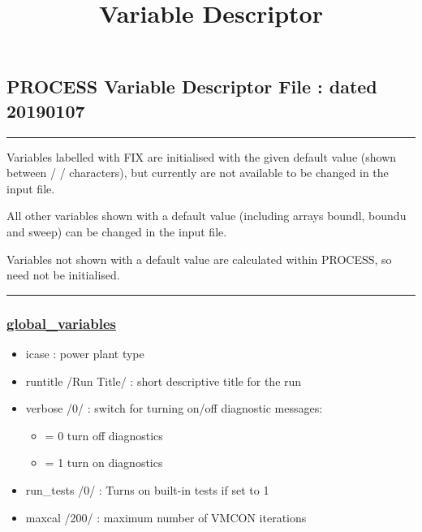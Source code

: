 \documentclass[]{article}
\title{Variable Descriptor}
\date{}
\providecommand{\tightlist}{%
  \setlength{\itemsep}{0pt}\setlength{\parskip}{0pt}}
\begin{document}
\maketitle

\subsection{PROCESS Variable Descriptor File : dated
20190107}\label{process-variable-descriptor-file-dated-20190107}

\begin{center}\rule{0.5\linewidth}{\linethickness}\end{center}

Variables labelled with FIX are initialised with the given default value
(shown between / / characters), but currently are not available to be
changed in the input file.

All other variables shown with a default value (including arrays boundl,
boundu and sweep) can be changed in the input file.

Variables not shown with a default value are calculated within PROCESS,
so need not be initialised.

\begin{center}\rule{0.5\linewidth}{\linethickness}\end{center}

\subsubsection{\texorpdfstring{\href{global_variables.html}{global\_variables}}{global\_variables}}\label{global_variables}

\begin{itemize}
\tightlist
\item
  icase : power plant type
\item
  runtitle /Run Title/ : short descriptive title for the run
\item
  verbose /0/ : switch for turning on/off diagnostic messages:

  \begin{itemize}
  \tightlist
  \item
    = 0 turn off diagnostics
  \item
    = 1 turn on diagnostics
  \end{itemize}
\item
  run\_tests /0/ : Turns on built-in tests if set to 1
\item
  maxcal /200/ : maximum number of VMCON iterations
\end{itemize}
\end{document}

